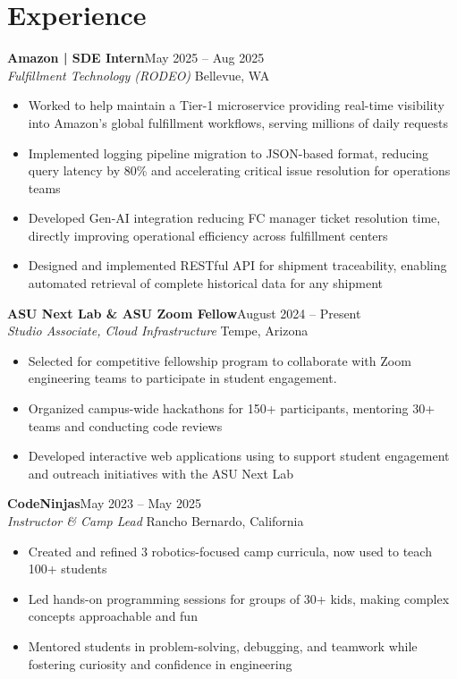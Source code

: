 \documentclass[a4paper,10pt]{article}
\newcommand{\entry}[2]{
  \noindent\textbf{#1}\hfill{#2}\\[-0.25em]
}
\begin{document}
\vspace{-2.5em}
\section{Experience}
\entry{Amazon | SDE Intern}{May 2025 -- Aug 2025}
\textit{Fulfillment Technology (RODEO)} \hfill Bellevue, WA
\begin{itemize}[noitemsep,parsep=0pt,leftmargin=*]
  \item Worked to help maintain a Tier-1 microservice providing real-time visibility into Amazon's global fulfillment workflows, serving millions of daily requests
  \item Implemented logging pipeline migration to JSON-based format, reducing query latency by 80\% and accelerating critical issue resolution for operations teams
  \item Developed Gen-AI integration reducing FC manager ticket resolution time, directly improving operational efficiency across fulfillment centers
  \item Designed and implemented RESTful API for shipment traceability, enabling automated retrieval of complete historical data for any shipment
\end{itemize}
\entry{ASU Next Lab \& ASU Zoom Fellow}{August 2024 -- Present}
\textit{Studio Associate, Cloud Infrastructure} \hfill Tempe, Arizona
\begin{itemize}[noitemsep,parsep=0pt,leftmargin=*]
    \item Selected for competitive fellowship program to collaborate with Zoom engineering teams to participate in student engagement.
    \item Organized campus-wide hackathons for 150+ participants, mentoring 30+ teams and conducting code reviews
    \item Developed interactive web applications using to support student engagement and outreach initiatives with the ASU Next Lab
\end{itemize}

\vspace{-0.5em}
\entry{CodeNinjas}{May 2023 -- May 2025}
\textit{Instructor \& Camp Lead} \hfill Rancho Bernardo, California
\vspace{-0.5em}
\begin{itemize}[noitemsep,parsep=0pt,leftmargin=*]
    \item Created and refined 3 robotics-focused camp curricula, now used to teach 100+ students
    \item Led hands-on programming sessions for groups of 30+ kids, making complex concepts approachable and fun
    \item Mentored students in problem-solving, debugging, and teamwork while fostering curiosity and confidence in engineering
\end{itemize}
\vspace{-2em}
\end{document}
